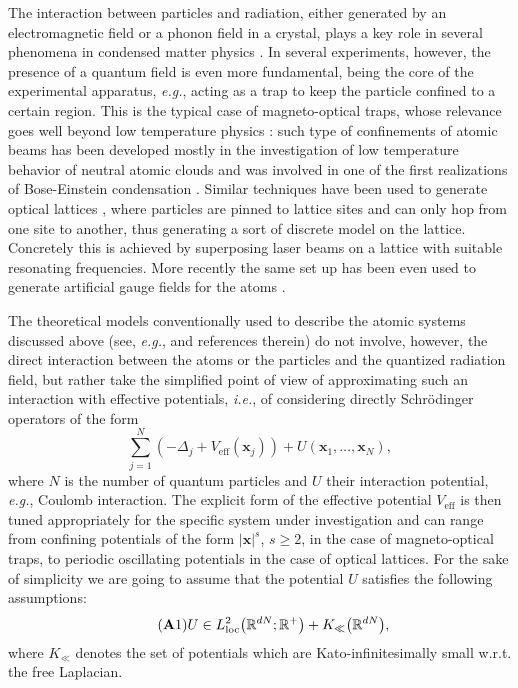 \documentclass[11pt,a4paper,reqno]{amsart}
\theoremstyle{definition}
\numberwithin{equation}{section}
\newcommand{\beq}{\begin{equation}}
\newcommand{\eeq}{\end{equation}}
\renewcommand{\geq}{\geqslant}
\newcommand{\lf}{\left}
\newcommand{\ri}{\right}
\newcommand{\xv}{\mathbf{x}}
\newcommand{\R}{\mathbb{R}}
\begin{document}
The interaction between particles and radiation, either generated by an electromagnetic field or a phonon
field in a crystal, plays a key role in several phenomena in condensed matter physics \cite{Coh1998}. In
several experiments, however, the presence of a quantum field is even more fundamental, being the core of the
experimental apparatus, {\it e.g.}, acting as a trap to keep the particle confined to a certain region. This
is the typical case of magneto-optical traps, whose relevance goes well beyond low temperature physics
\cite{Ash1997}: such type of confinements of atomic beams \cite{DalCoh2001} has been developed mostly in the
investigation of low temperature behavior of neutral atomic clouds and was involved in one of the first
realizations of Bose-Einstein condensation \cite{Ket1995}. Similar techniques have been used to generate
optical lattices \cite{BDZ2008}, where particles are pinned to lattice sites and can only hop from one site to
another, thus generating a sort of discrete model on the lattice. Concretely this is achieved by superposing
laser beams on a lattice with suitable resonating frequencies.  More recently the same set up has been even
used to generate artificial gauge fields for the atoms \cite{Dal2016}.

The theoretical models conventionally used to describe the atomic systems discussed above (see, {\it e.g.},
\cite{PetSmi2008} and references therein) do not involve, however, the direct interaction between the atoms
or the particles and the quantized radiation field, but rather take the simplified point of view of
approximating such an interaction with effective potentials, {\it i.e.}, of considering directly
Schr\"{o}dinger operators of the form
\beq
	\label{eq:effective so}
	\sum_{j =1}^N \lf( - \Delta_j + V_{\mathrm{eff}}(\xv_j) \ri) + U(\xv_1, \ldots, \xv_N),
\eeq
where $ N $ is the number of quantum particles and $ U $ their interaction potential, {\it e.g.}, Coulomb interaction. The explicit form of the effective potential $ V_{\mathrm{eff}} $ is then tuned appropriately for the specific system under investigation and can range from confining potentials of the form $ |\xv|^s $, $ s \geq 2 $, in the case of magneto-optical traps, to periodic oscillating potentials in the case of optical lattices. For the sake of simplicity we are going to assume that the potential $ U $ satisfies the following assumptions:
\beq
	\label{eq:V}\tag{{\bf A}1}
	U \in L^2_{\mathrm{loc}}\big(\R^{dN};\R^+\big) + K_{\ll}\big(\R^{dN}\big),
\eeq
where $  K_{\ll} $ denotes the set of potentials which are Kato-infinitesimally small w.r.t. the free Laplacian.
\end{document}
